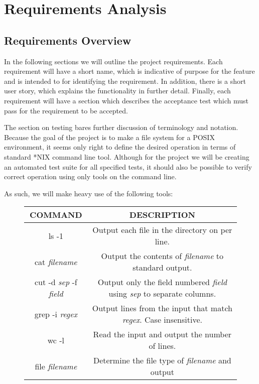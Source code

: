 \section{Requirements Analysis}

\subsection{Requirements Overview}

In the following sections we will outline the project requirements. Each
requirement will have a short name, which is indicative of purpose for the
feature and is intended to for identifying the requirement. In addition, there
is a short user story, which explains the functionality in further detail.
Finally, each requirement will have a section which describes the acceptance
test which must pass for the requirement to be accepted.

The section on testing bares further discussion of terminology and notation.
Because the goal of the project is to make a file system for a POSIX
environment, it seems only right to define the desired operation in terms of
standard *NIX command line tool. Although for the project we will be creating an
automated test suite for all specified tests, it should also be possible to
verify correct operation using only tools on the command line.

As such, we will make heavy use of the following tools:

\begin{figure}[H]
\centering
\begin{tabular}{|c|c|}
\hline
COMMAND & DESCRIPTION \\\hline

ls -1 & Output each file in the directory on per line.\\

cat \textit{filename} & Output the contents of \textit{filename} to standard
output.\\

cut -d \textit{sep} -f \textit{field} & Output only the field numbered
\textit{field} using \textit{sep} to separate columns.\\

grep -i \textit{regex} & Output lines from the input that match \textit{regex}.
Case insensitive.\\

wc -l & Read the input and output the number of lines.\\

file \textit{filename} & Determine the file type of \textit{filename} and output\\\hline
\end{tabular}
\end{figure}

